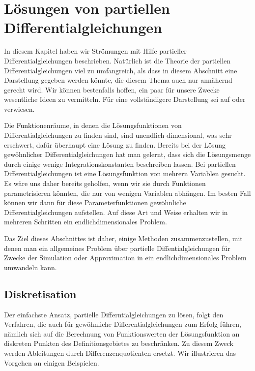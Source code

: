 %
%
%
\section{Lösungen von partiellen Differentialgleichungen%
\label{section:pdeloesungen}}
In diesem Kapitel haben wir Strömungen mit Hilfe partieller
Differentialgleichungen beschrieben.
Natürlich ist die Theorie der partiellen Differentialgleichungen viel
zu umfangreich, als dass in diesem Abschnitt eine Darstellung gegeben
werden könnte, die diesem Thema auch nur annähernd gerecht wird.
Wir können bestenfalls hoffen, ein paar für unsere Zwecke wesentliche
Ideen zu vermitteln.
Für eine vollständigere Darstellung sei auf \cite{skript:pde}
oder \cite{skript:part-diff} verwiesen.

Die Funktionenräume, in denen die Lösungsfunktionen von Differentialgleichungen
zu finden sind, sind unendlich dimensional, was sehr erschwert,
dafür überhaupt eine Lösung zu finden.
Bereits bei der Lösung gewöhnlicher Differentialgleichungen hat man
gelernt, dass sich die Lösungsmenge durch einige wenige Integrationskonstanten
beschreiben lassen.
Bei partiellen Differentialgleichungen ist eine Lösungsfunktion von
mehrern Variablen gesucht.
Es wäre uns daher bereits geholfen, wenn wir sie durch
Funktionen parametrisieren könnten, die nur von wenigen Variablen
abhängen.
Im besten Fall können wir dann für diese Parameterfunktionen gewöhnliche
Differentialgleichungen aufstellen.
Auf diese Art und Weise erhalten wir in mehreren Schritten ein
endlichdimensionales Problem.

Das Ziel dieses Abschnittes ist daher, einige Methoden zusammenzustellen,
mit denen man ein allgemeines Problem über partielle Diffentialgleichungen
für Zwecke der Simulation oder Approximation
in ein endlichdimensionales Problem umwandeln kann.

\subsection{Diskretisation\label{section:diskretisation}}
Der einfachste Ansatz, partielle Differntialgleichungen zu lösen,
folgt den Verfahren, die auch für gewöhnliche Differentialgleichungen
\cite{skript:mathsem-dgl} 
zum Erfolg führen, nämlich sich auf die Berechnung von Funktionswerten
der Lösungsfunktion an diskreten Punkten des Definitionsgebietes zu
beschränken.
Zu diesem Zweck werden Ableitungen durch Differenzenquotienten ersetzt.
Wir illustrieren das Vorgehen an einigen Beispielen.

